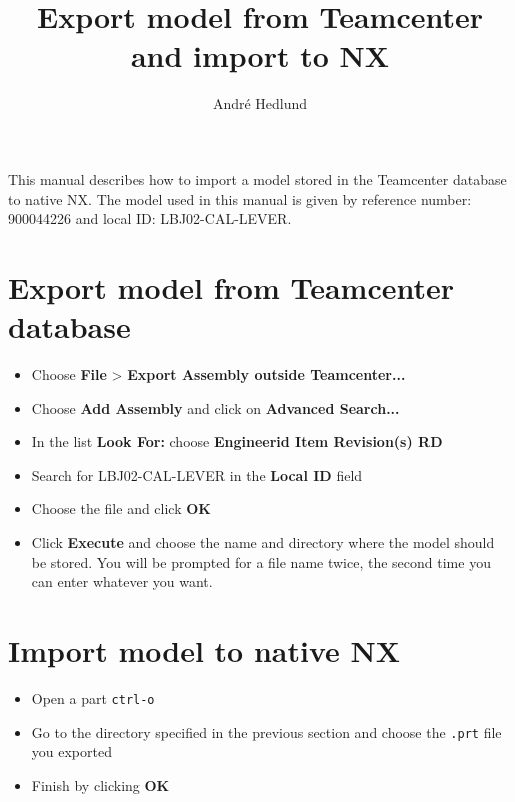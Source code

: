\documentclass[10pt,a4paper,notitlepage]{article}
\author{Andr\'e Hedlund}
\title{Export model from Teamcenter and import to NX}
\begin{document}
\maketitle
This manual describes how to import a model stored in the Teamcenter database to native NX. The model used in this manual is given by reference number: 900044226 and local ID: LBJ02-CAL-LEVER.
\section{Export model from Teamcenter database}
\begin{itemize}
\item Choose \textbf{File} > \textbf{Export Assembly outside Teamcenter...}
\item Choose \textbf{Add Assembly} and click on \textbf{Advanced Search...}
\item In the list \textbf{Look For:} choose \textbf{Engineerid Item Revision(s) RD}
\item Search for LBJ02-CAL-LEVER in the \textbf{Local ID} field
\item Choose the file and click \textbf{OK}
\item Click \textbf{Execute} and choose the name and directory where the model should be stored. You will be prompted for a file name twice, the second time you can enter whatever you want.
\end{itemize}
\section{Import model to native NX}
\begin{itemize}
\item Open a part \texttt{ctrl-o} 
\item Go to the directory specified in the previous section and choose the \texttt{.prt} file you exported
\item Finish by clicking \textbf{OK}
\end{itemize}


\end{document}
